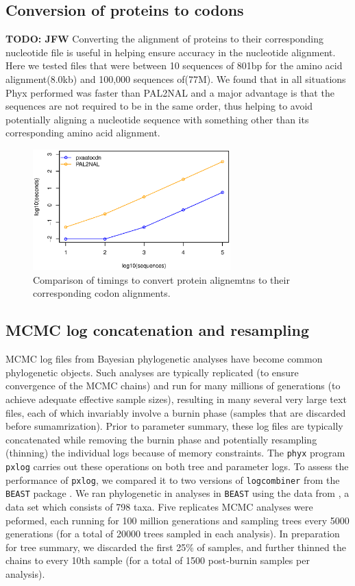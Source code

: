 \documentclass{article}
\begin{document}
\subsection{Conversion of proteins to codons}
\textbf{TODO: JFW} Converting the alignment of proteins to
their corresponding nucleotide file is useful in helping ensure
accuracy in the nucleotide alignment. Here we tested files that
were between 10 sequences of 801bp for the amino acid alignment(8.0kb) 
and 100,000 sequences of(77M). We found that in all situations
Phyx performed was faster than PAL2NAL\cite{Suyama2006} and a major advantage is that the sequences are not required to be in the same order, thus helping to avoid potentially
aligning a nucleotide sequence with something other than its corresponding
amino acid alignment.

\begin{figure}[!h]
    \centering
    \includegraphics[width=3.0in]{aatocdn}
    \caption{Comparison of timings to convert protein alignemtns to
    their corresponding codon alignments.}
    \label{proteincodonfigure}
\label{fig:S2}
\end{figure}

\subsection{MCMC log concatenation and resampling}
MCMC log files from Bayesian phylogenetic analyses have become common
phylogenetic objects. Such analyses are typically replicated (to ensure
convergence of the MCMC chains) and run for many millions of generations
(to achieve adequate effective sample sizes), resulting in many several 
very large text files, each of which invariably involve a burnin phase
(samples that are discarded before sumamrization). Prior to parameter
summary, these log files are typically concatenated while removing the
burnin phase and potentially resampling (thinning) the individual logs
because of memory constraints. The \texttt{phyx} program \texttt{pxlog}
carries out these operations on both tree and parameter logs. To assess
the performance of \texttt{pxlog}, we compared it to two versions of
\texttt{logcombiner} from the \texttt{BEAST} package
\cite{DrummondRambaut2007}\cite{Bouckaert2014}.
We ran phylogenetic in analyses in \texttt{BEAST} using the data from
\cite{Magallon2015}, a data set which consists of 798 taxa. Five
replicates MCMC analyses were peformed, each running for 100 million
generations and sampling trees every 5000 generations (for a total of
20000 trees sampled in each analysis). In preparation for tree summary,
we discarded the first 25\% of samples, and further thinned the chains
to every 10th sample (for a total of 1500 post-burnin samples per analysis).
\end{document}
